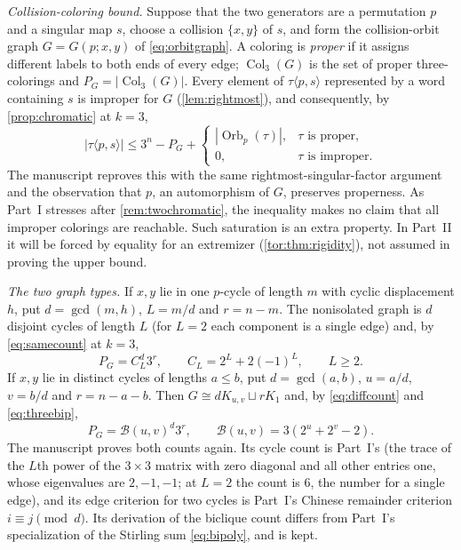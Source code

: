 \documentclass[11pt,a4paper]{article}
\numberwithin{equation}{section}
\theoremstyle{definition}
\theoremstyle{remark}
\newcommand{\Orb}{\operatorname{Orb}}
\newcommand{\Bip}{\mathcal B}
\begin{document}
\emph{Collision-coloring bound.} Suppose that the two generators are a
permutation $p$ and a singular map $s$, choose a collision $\{x,y\}$ of $s$,
and form the collision-orbit graph $G=G(p;x,y)$ of \eqref{eq:orbitgraph}. A
coloring is \emph{proper} if it assigns different labels to both ends of
every edge; $\operatorname{Col}_3(G)$ is the set of proper three-colorings
and $P_G=|\operatorname{Col}_3(G)|$. Every element of $\tau\langle p,s\rangle$
represented by a word containing $s$ is improper for $G$
(\cref{lem:rightmost}), and consequently, by \cref{prop:chromatic} at $k=3$,
\begin{equation}\label{tor:eq:graphbound}
 |\tau\langle p,s\rangle|
 \le 3^n-P_G+
 \begin{cases}
 |\Orb_p(\tau)|,&\tau\text{ is proper},\\
 0,&\tau\text{ is improper}.
 \end{cases}
\end{equation}
The manuscript reproves this with the same rightmost-singular-factor argument
and the observation that $p$, an automorphism of $G$, preserves properness.
As Part~I stresses after \cref{rem:twochromatic}, the inequality makes no
claim that all improper colorings are reachable. Such saturation is an extra
property. In Part~II it will be forced by equality for an extremizer
(\cref{tor:thm:rigidity}), not assumed in proving the upper bound.

\emph{The two graph types.} If $x,y$ lie in one $p$-cycle of length $m$ with
cyclic displacement $h$, put $d=\gcd(m,h)$, $L=m/d$ and $r=n-m$. The
nonisolated graph is $d$ disjoint cycles of length $L$ (for $L=2$ each
component is a single edge) and, by \eqref{eq:samecount} at $k=3$,
\begin{equation}\label{tor:eq:samecount}
 P_G=C_L^d3^r,\qquad C_L=2^L+2(-1)^L,\qquad L\ge2.
\end{equation}
If $x,y$ lie in distinct cycles of lengths $a\le b$, put $d=\gcd(a,b)$,
$u=a/d$, $v=b/d$ and $r=n-a-b$. Then $G\cong dK_{u,v}\sqcup rK_1$ and, by
\eqref{eq:diffcount} and \eqref{eq:threebip},
\begin{equation}\label{tor:eq:crosscount}
 P_G=\Bip(u,v)^d3^r,
 \qquad \Bip(u,v)=3(2^u+2^v-2).
\end{equation}
The manuscript proves both counts again. Its cycle count is Part~I's (the trace
of the $L$th power of the $3\times3$ matrix with zero diagonal and all other
entries one, whose eigenvalues are $2,-1,-1$; at $L=2$ the count is $6$, the
number for a single edge), and its edge criterion for two cycles is Part~I's
Chinese remainder criterion $i\equiv j\pmod d$. Its derivation of the
biclique count differs from Part~I's specialization of the Stirling sum
\eqref{eq:bipoly}, and is kept.
\end{document}
